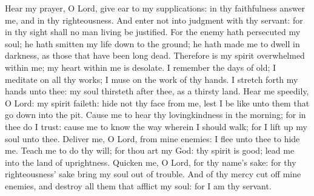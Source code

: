 Hear my prayer, O Lord, give ear to my supplications: in thy faithfulness answer me, and in thy righteousness. And enter not into judgment with thy servant: for in thy sight shall no man living be justified. For the enemy hath persecuted my soul; he hath smitten my life down to the ground; he hath made me to dwell in darkness, as those that have been long dead. Therefore is my spirit overwhelmed within me; my heart within me is desolate. I remember the days of old; I meditate on all thy works; I muse on the work of thy hands. I stretch forth my hands unto thee: my soul thirsteth after thee, as a thirsty land. Hear me speedily, O Lord: my spirit faileth: hide not thy face from me, lest I be like unto them that go down into the pit. Cause me to hear thy lovingkindness in the morning; for in thee do I trust: cause me to know the way wherein I should walk; for I lift up my soul unto thee. Deliver me, O Lord, from mine enemies: I flee unto thee to hide me. Teach me to do thy will; for thou art my God: thy spirit is good; lead me into the land of uprightness. Quicken me, O Lord, for thy name's sake: for thy righteousness' sake bring my soul out of trouble. And of thy mercy cut off mine enemies, and destroy all them that afflict my soul: for I am thy servant.
